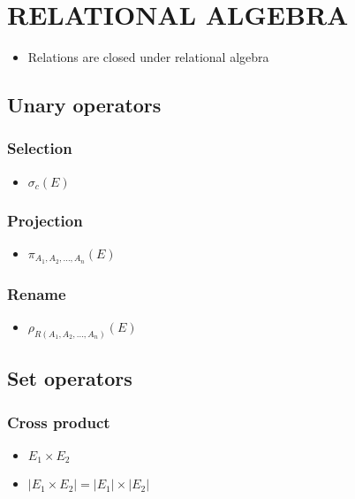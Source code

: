 \documentclass[10pt]{article}
\begin{document}
\section{RELATIONAL ALGEBRA}

\begin{itemize}
	\item Relations are closed under relational algebra
\end{itemize}

\subsection{Unary operators}

\subsubsection{Selection}

\begin{itemize}
	\item $\sigma_{c}(E)$
\end{itemize}

\subsubsection{Projection}

\begin{itemize}
	\item $\pi_{A_1, A_2, \ldots, A_n}(E)$
\end{itemize}

\subsubsection{Rename}

\begin{itemize}
	\item $\rho_{R(A_1, A_2, \ldots, A_n)}(E)$
\end{itemize}

\subsection{Set operators}

\subsubsection{Cross product}

\begin{itemize}
	\item $E_1 \times E_2$
	\item $|E_1 \times E_2| = |E_1| \times |E_2|$
\end{itemize}
\end{document}
